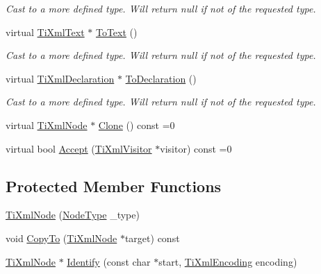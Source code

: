 \begin{DoxyCompactItemize}
\begin{DoxyCompactList}\small\item\em Cast to a more defined type. Will return null if not of the requested type. \item\end{DoxyCompactList}\item 
virtual \hyperlink{class_ti_xml_text}{TiXmlText} $\ast$ \hyperlink{class_ti_xml_node_a3ddfbcac78fbea041fad57e5c6d60a03}{ToText} ()
\begin{DoxyCompactList}\small\item\em Cast to a more defined type. Will return null if not of the requested type. \item\end{DoxyCompactList}\item 
virtual \hyperlink{class_ti_xml_declaration}{TiXmlDeclaration} $\ast$ \hyperlink{class_ti_xml_node_a4027136ca820ff4a636b607231b6a6df}{ToDeclaration} ()
\begin{DoxyCompactList}\small\item\em Cast to a more defined type. Will return null if not of the requested type. \item\end{DoxyCompactList}\item 
virtual \hyperlink{class_ti_xml_node}{TiXmlNode} $\ast$ \hyperlink{class_ti_xml_node_a4508cc3a2d7a98e96a54cc09c37a78a4}{Clone} () const =0
\item 
virtual bool \hyperlink{class_ti_xml_node_acc0f88b7462c6cb73809d410a4f5bb86}{Accept} (\hyperlink{class_ti_xml_visitor}{TiXmlVisitor} $\ast$visitor) const =0
\end{DoxyCompactItemize}
\subsection*{Protected Member Functions}
\begin{DoxyCompactItemize}
\item 
\hyperlink{class_ti_xml_node_a3f46721695868667113c7487ff123f20}{TiXmlNode} (\hyperlink{class_ti_xml_node_a836eded4920ab9e9ef28496f48cd95a2}{NodeType} \_\-type)
\item 
void \hyperlink{class_ti_xml_node_ab6056978923ad8350fb5164af32d8038}{CopyTo} (\hyperlink{class_ti_xml_node}{TiXmlNode} $\ast$target) const 
\item 
\hyperlink{class_ti_xml_node}{TiXmlNode} $\ast$ \hyperlink{class_ti_xml_node_ac1e3a8e7578be463b04617786120c2bb}{Identify} (const char $\ast$start, \hyperlink{tinyxml_8h_a88d51847a13ee0f4b4d320d03d2c4d96}{TiXmlEncoding} encoding)
\end{DoxyCompactItemize}
